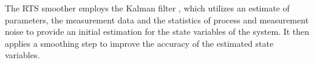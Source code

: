 %
%
%
%
%
The RTS smoother employs the Kalman filter \cite{kalman1960new}, which utilizes an estimate of parameters, the measurement data and the statistics of process and measurement noise to provide an initial estimation for the state variables of the system. It then applies a smoothing step to improve the accuracy of the estimated state variables.
%

